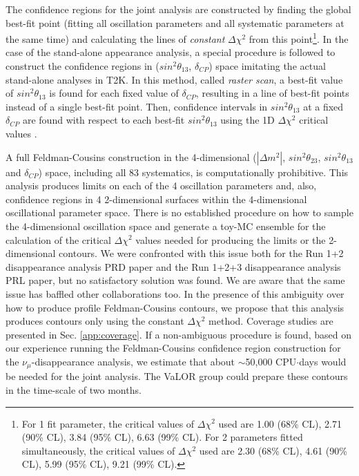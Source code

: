 The confidence regions for the joint analysis are constructed by finding the global best-fit point
(fitting all oscillation parameters and all systematic parameters at the same time)
and calculating the lines of {\em constant} $\Delta{\chi^{2}}$ from this point\footnote{
For 1 fit parameter, the critical values of $\Delta{\chi^{2}}$ used are 
1.00 (68\% CL), 2.71 (90\% CL), 3.84 (95\% CL), 6.63 (99\% CL).
For 2 parameters fitted simultaneously, the critical values of $\Delta{\chi^{2}}$ used are 
2.30 (68\% CL), 4.61 (90\% CL), 5.99 (95\% CL), 9.21 (99\% CL).
}. In the case of the stand-alone appearance analysis, a special procedure is followed 
to construct the confidence regions in ($sin^{2}\theta_{13}$, $\delta_{CP}$) space
 imitating the actual stand-alone analyses in T2K. In this method, called \textit{raster scan}, a best-fit
 value of  $sin^{2}\theta_{13}$ is found for each fixed value of $\delta_{CP}$, resulting in a line
 of best-fit points instead of a single best-fit point. Then, confidence intervals in $sin^{2}\theta_{13}$
 at a fixed $\delta_{CP}$ are found with respect to each best-fit $sin^{2}\theta_{13}$ using the 1D
 $\Delta{\chi^{2}}$ critical values \cite{FeldmanCousins}.

A full Feldman-Cousins construction in the 4-dimensional
($|\Delta m^{2}|$, $sin^{2}\theta_{23}$, $sin^{2}\theta_{13}$ and $\delta_{CP}$) space,
including all 83 systematics, is computationally prohibitive.
This analysis produces limits on each of the 4 oscillation parameters and, also,
confidence regions in 4 2-dimensional surfaces within the 4-dimensional oscillational parameter space.
There is no established procedure on how to sample the 4-dimensional oscillation space
and generate a toy-MC ensemble for the calculation of the critical $\Delta{\chi^{2}}$ values
needed for producing the limits or the 2-dimensional contours. We were confronted with
this issue both for the Run 1+2 disappearance analysis PRD paper
and the Run 1+2+3 disappearance analysis PRL paper, but no satisfactory solution was found.
We are aware that the same issue has baffled other collaborations too.
In the presence of this ambiguity over how to produce profile Feldman-Cousins contours, we propose
that this analysis produces contours only using the constant $\Delta{\chi^{2}}$ method.
Coverage studies are presented in Sec. \ref{app:coverage}.
If a non-ambiguous procedure is found,
based on our experience running the  Feldman-Cousins confidence region construction for the $\nu_{\mu}$-disappearance analysis,
we estimate that about $\sim$50,000 CPU$\cdot$days would be needed for the joint analysis.
The VaLOR group could prepare these contours in the time-scale of two months.


